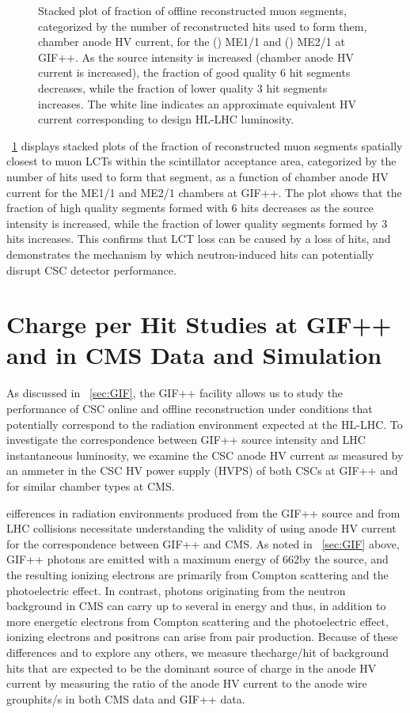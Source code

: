 \begin{figure}[htbp]
	\caption{Stacked plot of fraction of offline reconstructed muon segments, categorized by the number of reconstructed hits used to form them, \vs chamber anode HV current, for the () ME1/1 and () ME2/1 at GIF++. As the source intensity is increased (chamber anode HV current is increased), the fraction of good quality 6 hit segments decreases, while the fraction of lower quality 3 hit segments increases. The white line indicates an approximate equivalent HV current corresponding to design HL-LHC luminosity.}
	\label{fig:seg_frac}
\end{figure}

\Fig~\ref{fig:seg_frac} displays stacked plots of the fraction of reconstructed muon segments spatially closest to muon LCTs within the scintillator acceptance area, categorized by the number of hits used to form that segment, as a function of chamber anode HV current for the ME1/1 and ME2/1 chambers at GIF++. The plot shows that the fraction of high quality segments formed with 6 hits decreases as the source intensity is increased, while the fraction of lower quality segments formed by 3 hits increases. This confirms that LCT loss can be caused by a loss of hits, and demonstrates the mechanism by which neutron-induced hits can potentially disrupt CSC detector performance.

\section{Charge per Hit Studies at GIF++ and in CMS Data and Simulation}
\label{sec:chargeperhit}

As discussed in \Sec~\ref{sec:GIF}, the GIF++ facility allows us to study the performance of CSC online and offline reconstruction under conditions that potentially correspond to the radiation environment expected at the HL-LHC. To investigate the correspondence between GIF++ source intensity and LHC instantaneous luminosity, we examine the CSC anode HV current as measured by an ammeter in the CSC HV power supply (HVPS) of both CSCs at GIF++ and for similar chamber types at CMS.

eifferences in radiation environments produced from the GIF++ source and from LHC \pp collisions necessitate understanding the validity of using anode HV current for the correspondence between GIF++ and CMS. As noted in \Sec~\ref{sec:GIF} above, GIF++ photons are emitted with a maximum energy of 662\keV by the  source, and the resulting ionizing electrons are primarily from Compton scattering and the photoelectric effect. In contrast, photons originating from the neutron background in CMS can carry up to several \MeVns in energy and thus, in addition to more energetic electrons from Compton scattering and the photoelectric effect, ionizing electrons and positrons can arise from pair production. Because of these differences and to explore any others, we measure the\unit{charge/hit} of background hits that are expected to be the dominant source of charge in the anode HV current by measuring the ratio of the anode HV current to the anode wire group\unit{hits/s} in both CMS data and GIF++ data. 

